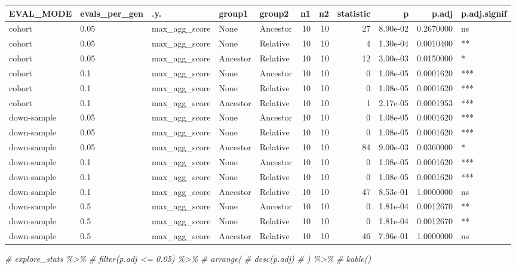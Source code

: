 \documentclass[
]{book}
\newenvironment{Shaded}{\begin{snugshade}}{\end{snugshade}}
\newcommand{\CommentTok}[1]{\textcolor[rgb]{0.56,0.35,0.01}{\textit{#1}}}
\begin{document}
\begin{tabular}{l|l|l|l|l|r|r|r|r|r|l}
\hline
EVAL\_MODE & evals\_per\_gen & .y. & group1 & group2 & n1 & n2 & statistic & p & p.adj & p.adj.signif\\
\hline
cohort & 0.05 & max\_agg\_score & None & Ancestor & 10 & 10 & 27 & 8.90e-02 & 0.2670000 & ns\\
\hline
cohort & 0.05 & max\_agg\_score & None & Relative & 10 & 10 & 4 & 1.30e-04 & 0.0010400 & **\\
\hline
cohort & 0.05 & max\_agg\_score & Ancestor & Relative & 10 & 10 & 12 & 3.00e-03 & 0.0150000 & *\\
\hline
cohort & 0.1 & max\_agg\_score & None & Ancestor & 10 & 10 & 0 & 1.08e-05 & 0.0001620 & ***\\
\hline
cohort & 0.1 & max\_agg\_score & None & Relative & 10 & 10 & 0 & 1.08e-05 & 0.0001620 & ***\\
\hline
cohort & 0.1 & max\_agg\_score & Ancestor & Relative & 10 & 10 & 1 & 2.17e-05 & 0.0001953 & ***\\
\hline
down-sample & 0.05 & max\_agg\_score & None & Ancestor & 10 & 10 & 0 & 1.08e-05 & 0.0001620 & ***\\
\hline
down-sample & 0.05 & max\_agg\_score & None & Relative & 10 & 10 & 0 & 1.08e-05 & 0.0001620 & ***\\
\hline
down-sample & 0.05 & max\_agg\_score & Ancestor & Relative & 10 & 10 & 84 & 9.00e-03 & 0.0360000 & *\\
\hline
down-sample & 0.1 & max\_agg\_score & None & Ancestor & 10 & 10 & 0 & 1.08e-05 & 0.0001620 & ***\\
\hline
down-sample & 0.1 & max\_agg\_score & None & Relative & 10 & 10 & 0 & 1.08e-05 & 0.0001620 & ***\\
\hline
down-sample & 0.1 & max\_agg\_score & Ancestor & Relative & 10 & 10 & 47 & 8.53e-01 & 1.0000000 & ns\\
\hline
down-sample & 0.5 & max\_agg\_score & None & Ancestor & 10 & 10 & 0 & 1.81e-04 & 0.0012670 & **\\
\hline
down-sample & 0.5 & max\_agg\_score & None & Relative & 10 & 10 & 0 & 1.81e-04 & 0.0012670 & **\\
\hline
down-sample & 0.5 & max\_agg\_score & Ancestor & Relative & 10 & 10 & 46 & 7.96e-01 & 1.0000000 & ns\\
\hline
\end{tabular}

\begin{Shaded}
\begin{Highlighting}[]
\CommentTok{\# explore\_stats \%\textgreater{}\%}
\CommentTok{\#   filter(p.adj \textless{}= 0.05) \%\textgreater{}\%}
\CommentTok{\#   arrange(}
\CommentTok{\#     desc(p.adj)}
\CommentTok{\#   ) \%\textgreater{}\%}
\CommentTok{\#   kable()}
\end{Highlighting}
\end{Shaded}
\end{document}
